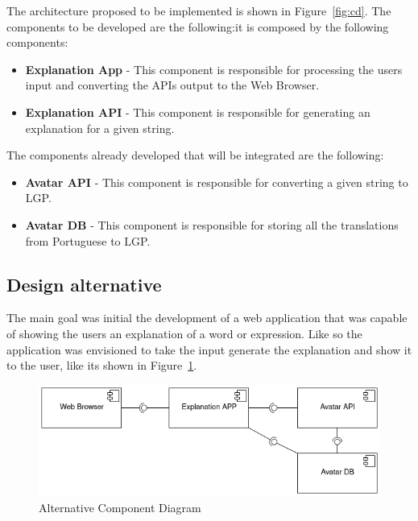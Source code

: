 The architecture proposed to be implemented is shown in Figure~\ref{fig:cd}.
The components to be developed are the following:it is composed by the following components:

\begin{itemize}
    \item \textbf{Explanation App} - This component is responsible for processing the users input and converting the APIs output to the Web Browser.
    \item \textbf{Explanation API} - This component is responsible for generating an explanation for a given string.
\end{itemize}

The components already developed that will be integrated are the following:
\begin{itemize}
    \item \textbf{Avatar API} - This component is responsible for converting a given string to \gls{LGP}.
    \item \textbf{Avatar DB} - This component is responsible for storing all the translations from Portuguese to \gls{LGP}.
\end{itemize}

\subsection{Design alternative}

The main goal was initial the development of a web application that was capable of showing the users an explanation of a word or expression.
Like so the application was envisioned to take the input generate the explanation and show it to the user, like its shown in Figure~\ref{fig:ocd}.

\begin{figure}[H]
\centering
\includegraphics[width=\textwidth,keepaspectratio]{ch4/assets/component_diagram_alternative.png}
\caption[Alternative Component Diagram]{Alternative Component Diagram}
\label{fig:ocd}
\end{figure}

